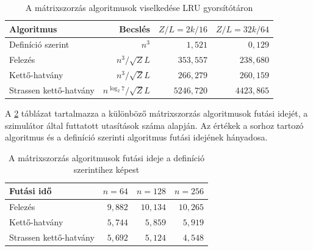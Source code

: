 \documentclass[12pt]{report}
\begin{document}
\begin{table}[ht]
\centering
\caption{A mátrixszorzás algoritmusok viselkedése LRU gyorsítótáron}
\label{table-matrix-multiply-algorithms}
\begin{tabular}{|l|r|r|r|}
\hline
Algoritmus & Becslés & $Z/L=2k/16$ & $Z/L=32k/64$ \\
\hline
Definíció szerint & $n^3$ & $1,521$ & $0,129$ \\
\hline
Felezés & $n^3 / \sqrt{Z}L$ & $353,557$ & $238,680$ \\
\hline
Kettő-hatvány & $n^3 / \sqrt{Z}L$ & $266,279$ & $260,159$ \\
\hline
Strassen kettő-hatvány & $n^{\log_{2}{7}} / \sqrt{Z}L$ & $5246,720$ & $4423,865$ \\
\hline
\end{tabular}
\end{table}

A \ref{table-matrix-multiply-algorithms-elapsed-cycles}
táblázat tartalmazza a különböző
mátrixszorzás algoritmusok futási idejét,
a szimulátor által futtatott utasítások száma alapján.
Az értékek a sorhoz tartozó algoritmus
és a definíció szerinti algoritmus futási idejének hányadosa.

\begin{table}[ht]
\centering
\caption{A mátrixszorzás algoritmusok futási ideje a definíció szerintihez képest}
\label{table-matrix-multiply-algorithms-elapsed-cycles}
\begin{tabular}{|l|r|r|r|}
\hline
Futási idő & $n=64$ & $n=128$ & $n=256$ \\
\hline
Felezés                & $9,882$ & $10,134$ & $10,265$ \\
\hline
Kettő-hatvány          & $5,744$ &  $5,859$ &  $5,919$ \\
\hline
Strassen kettő-hatvány & $5,692$ &  $5,124$ &  $4,548$ \\
\hline
\end{tabular}
\end{table}
\end{document}
